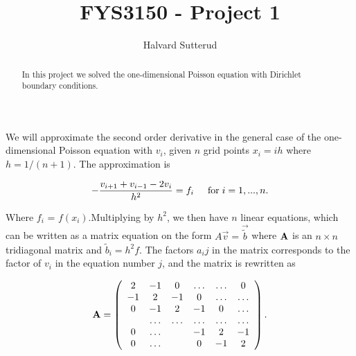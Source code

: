 \documentclass[a4paper,10pt,english]{article}
\title{FYS3150 - Project 1}
\author{Halvard Sutterud}
\begin{document}
\maketitle
\begin{abstract}
    In this project we solved the one-dimensional Poisson equation with
    Dirichlet boundary conditions. 
\end{abstract}

\newpage

We will approximate the second order derivative in the general case of the one-dimensional
Poisson equation with $v_i$, given $n$ grid points $x_i = ih$ where
$h=1/(n+1)$. The approximation is

\[ 
    - \frac{v_{i+1} + v_{i-1} - 2v_i}{h^2} = f_i \hspace{0.5cm}
    \mathrm{for} \hspace{0.1cm}i = 1, ... , n.
\]
        
Where $f_i$ = $f(x_i)$.Multiplying by $h^2$, we then have $n$ linear
equations, which can be written as a matrix equation on the form $A\vec{v}
= \vec{\tilde b}$ where $\bold{A}$ is an $n\times n$ tridiagonal matrix and
$\tilde b_i = h^2 f$.  The factors $a_ij$ in the matrix corresponds to the
factor of $v_i$ in the equation number $j$, and the matrix is rewritten as

\begin{equation}
    {\bf A} = \left(\begin{array}{cccccc}
                           2& -1& 0 &\dots   & \dots &0 \\
                           -1 & 2 & -1 &0 &\dots &\dots \\
                           0&-1 &2 & -1 & 0 & \dots \\
                           & \dots   & \dots &\dots   &\dots & \dots \\
                           0&\dots   &  &-1 &2& -1 \\
                           0&\dots    &  & 0  &-1 & 2 \\
                      \end{array} \right).
\end{equation}




    
\end{document}
